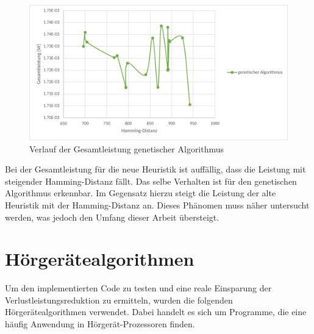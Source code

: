 \begin{figure}[H]
	\centering
	\includegraphics[width=\textwidth]{fig/totalpower_genetic.pdf}
	\caption{Verlauf der Gesamtleistung genetischer Algorithmus}
	\label{fig:totalpower_genetic}
\end{figure}

Bei der Gesamtleistung für die neue Heuristik ist auffällig, dass die Leistung mit steigender Hamming-Distanz fällt. Das selbe Verhalten ist für den genetischen Algorithmus erkennbar. Im Gegensatz hierzu steigt die Leistung der alte Heuristik mit der Hamming-Distanz an. Dieses Phänomen muss näher untersucht werden, was jedoch den Umfang dieser Arbeit übersteigt.

\section{Hörgerätealgorithmen}
\label{sec:testprogamme}
Um den implementierten Code zu testen und eine reale Einsparung der Verlustleistungsreduktion zu ermitteln, wurden die folgenden Hörgerätealgorithmen verwendet. Dabei handelt es sich um Programme, die eine häufig Anwendung in Hörgerät-Prozessoren finden.

